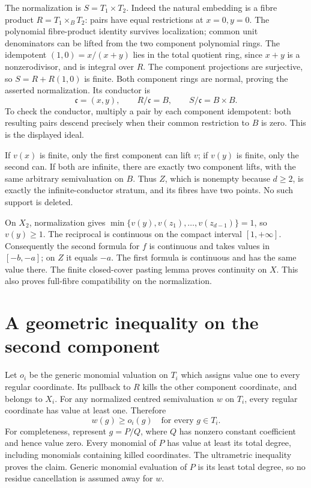 \documentclass[11pt]{article}
\begin{document}
The normalization is \(S=T_1\times T_2\).
Indeed the natural embedding is a fibre product
\(R=T_1\times_B T_2\): pairs have equal restrictions at \(x=0,y=0\).
The polynomial fibre-product identity survives localization; common unit
denominators can be lifted from the two component polynomial rings.
The idempotent \((1,0)=x/(x+y)\) lies in the total quotient ring, since
\(x+y\) is a nonzerodivisor, and is integral over \(R\).
The component projections are surjective, so \(S=R+R(1,0)\) is finite.
Both component rings are normal, proving the asserted normalization.
Its conductor is
\[
 \mathfrak c=(x,y),\qquad R/\mathfrak c=B,
 \qquad S/\mathfrak c=B\times B.
\]
To check the conductor, multiply a pair by each component idempotent:
both resulting pairs descend precisely when their common restriction to
\(B\) is zero. This is the displayed ideal.

If \(v(x)\) is finite, only the first component can lift \(v\); if
\(v(y)\) is finite, only the second can. If both are infinite, there
are exactly two component lifts, with the same arbitrary semivaluation
on \(B\). Thus \(Z\), which is nonempty because \(d\geq2\), is
exactly the infinite-conductor stratum, and its fibres have two points.
No such support is deleted.

On \(X_2\), normalization gives
\(\min\{v(y),v(z_1),\ldots,v(z_{d-1})\}=1\), so \(v(y)\geq1\).
The reciprocal is continuous on the compact interval \([1,+\infty]\).
Consequently the second formula for \(f\) is continuous and takes values
in \([-b,-a]\); on \(Z\) it equals \(-a\).
The first formula is continuous and has the same value there.
The finite closed-cover pasting lemma proves continuity on \(X\).
This also proves full-fibre compatibility on the normalization.

\section{A geometric inequality on the second component}

Let \(o_i\) be the generic monomial valuation on \(T_i\) which assigns
value one to every regular coordinate. Its pullback to \(R\) kills
the other component coordinate, and belongs to \(X_i\).
For any normalized centred semivaluation \(w\) on \(T_i\), every
regular coordinate has value at least one. Therefore
\[
 w(g)\geq o_i(g)\quad\text{for every }g\in T_i.
\]
For completeness, represent \(g=P/Q\), where \(Q\) has nonzero
constant coefficient and hence value zero. Every monomial of \(P\)
has value at least its total degree, including monomials containing
killed coordinates. The ultrametric inequality proves the claim.
Generic monomial evaluation of \(P\) is its least total degree, so
no residue cancellation is assumed away for \(w\).
\end{document}

